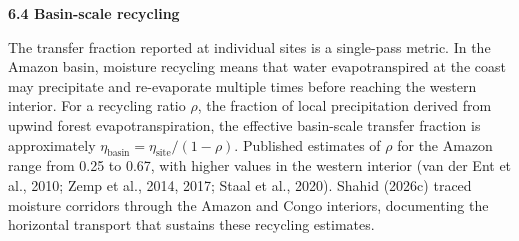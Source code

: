 \textbf{6.4 Basin-scale recycling}

The transfer fraction reported at individual sites is a single-pass metric. In the Amazon basin, moisture recycling means that water evapotranspired at the coast may precipitate and re-evaporate multiple times before reaching the western interior. For a recycling ratio \(\rho\), the fraction of local precipitation derived from upwind forest evapotranspiration, the effective basin-scale transfer fraction is approximately \(\eta_{\text{basin}} = \eta_{\text{site}}/(1-\rho)\). Published estimates of \(\rho\) for the Amazon range from 0.25 to 0.67, with higher values in the western interior (van der Ent et al., 2010; Zemp et al., 2014, 2017; Staal et al., 2020). Shahid (2026c) traced moisture corridors through the Amazon and Congo interiors, documenting the horizontal transport that sustains these recycling estimates.

